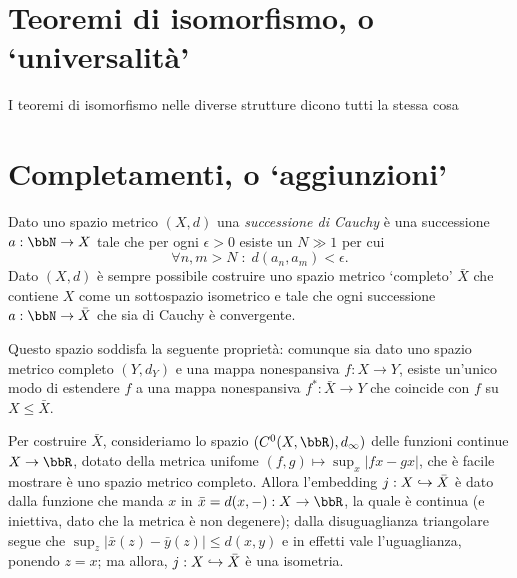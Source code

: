 \section*{Teoremi di isomorfismo, o `universalità'}
I teoremi di isomorfismo nelle diverse strutture dicono tutti la stessa cosa
\section*{Completamenti, o `aggiunzioni'}
Dato uno spazio metrico \((X,d)\) una \emph{successione di Cauchy} è una successione \(a : \bbN \to X\) tale che per ogni \(\epsilon>0\) esiste un \(N\gg 1\) per cui
\[\forall n,m> N\; : \; d(a_n,a_m) < \epsilon.\]
Dato \((X,d)\) è sempre possibile costruire uno spazio metrico `completo' \(\bar X\) che contiene \(X\) come un sottospazio isometrico e tale che ogni successione \(a : \bbN \to \bar X\) che sia di Cauchy è convergente.

Questo spazio soddisfa la seguente proprietà: comunque sia dato uno spazio metrico completo \((Y,d_Y)\) e una mappa nonespansiva \(f : X\to Y\), esiste un'unico modo di estendere \(f\) a una mappa nonespansiva \(f^* : \bar X \to Y\) che coincide con \(f\) su \(X\le \bar X\).

Per costruire \(\bar X\), consideriamo lo spazio \((C^0(X,\bbR),d_\infty)\) delle funzioni continue \(X\to\bbR\), dotato della metrica unifome \((f,g)\mapsto \sup_x |fx-gx|\), che è facile mostrare è uno spazio metrico completo. Allora l'embedding \(j : X\hookrightarrow \bar X\) è dato dalla funzione che manda \(x\) in \(\bar x = d(x,-) : X\to \bbR\), la quale è continua (e iniettiva, dato che la metrica è non degenere); dalla disuguaglianza triangolare segue che \(\sup_z|\bar{x}(z)-\bar{y}(z)|\le d(x,y)\) e in effetti vale l'uguaglianza, ponendo \(z=x\); ma allora, \(j : X\hookrightarrow \bar X\) è una isometria.

